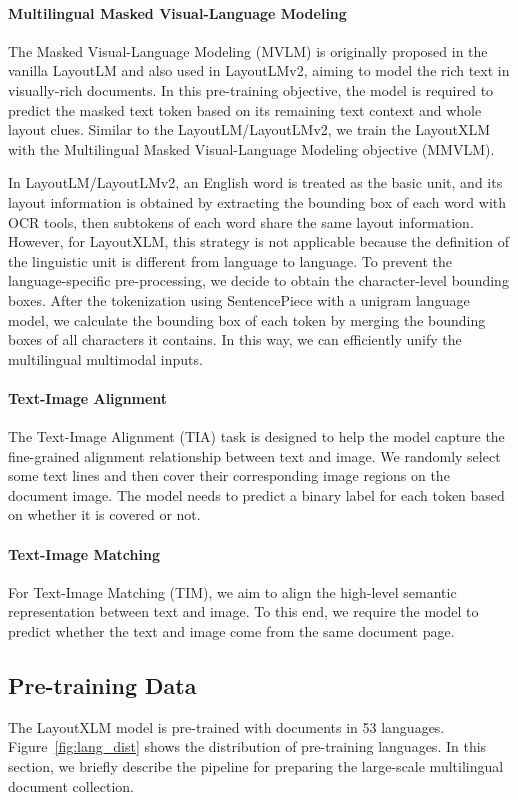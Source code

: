 \documentclass[11pt]{article}
\begin{document}
\paragraph{Multilingual Masked Visual-Language Modeling}
The Masked Visual-Language Modeling (MVLM) is originally proposed in the vanilla LayoutLM and also used in LayoutLMv2, aiming to model the rich text in visually-rich documents. In this pre-training objective, the model is required to predict the masked text token based on its remaining text context and whole layout clues. Similar to the LayoutLM/LayoutLMv2, we train the LayoutXLM with the Multilingual Masked Visual-Language Modeling objective (MMVLM). 

In LayoutLM/LayoutLMv2, an English word is treated as the basic unit, and its layout information is obtained by extracting the bounding box of each word with OCR tools, then subtokens of each word share the same layout information. However, for LayoutXLM, this strategy is not applicable because the definition of the linguistic unit is different from language to language. To prevent the language-specific pre-processing, we decide to obtain the character-level bounding boxes. After the tokenization using SentencePiece with a unigram language model, we calculate the bounding box of each token by merging the bounding boxes of all characters it contains. In this way, we can efficiently unify the multilingual multimodal inputs.


\paragraph{Text-Image Alignment}
The Text-Image Alignment (TIA) task is designed to help the model capture the fine-grained alignment relationship between text and image. We randomly select some text lines and then cover their corresponding image regions on the document image. The model needs to predict a binary label for each token based on whether it is covered or not.

\paragraph{Text-Image Matching}
For Text-Image Matching (TIM), we aim to align the high-level semantic representation between text and image. To this end, we require the model to predict whether the text and image come from the same document page.

\subsection{Pre-training Data}
The LayoutXLM model is pre-trained with documents in 53 languages. Figure~\ref{fig:lang_dist} shows the distribution of pre-training languages. In this section, we briefly describe the pipeline for preparing the large-scale multilingual document collection.
\end{document}

